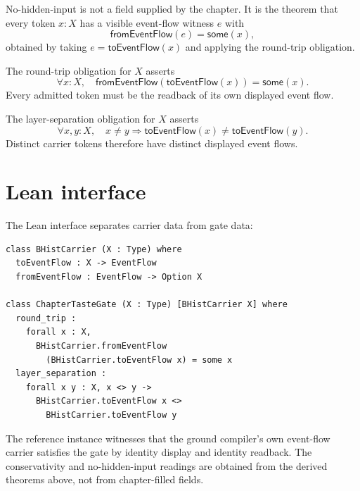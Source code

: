 \begin{definition}
\label{def:taste-gate-no-hidden-input}
No-hidden-input is not a field supplied by the chapter. It is the theorem that
every token $x:X$ has a visible event-flow witness $e$ with
$$
\mathsf{fromEventFlow}(e)=\mathsf{some}(x),
$$
obtained by taking $e=\mathsf{toEventFlow}(x)$ and applying the round-trip
obligation.
\end{definition}

\begin{definition}
\label{def:taste-gate-round-trip}
The round-trip obligation for $X$ asserts
$$
\forall x:X,\quad
\mathsf{fromEventFlow}(\mathsf{toEventFlow}(x))=\mathsf{some}(x).
$$
Every admitted token must be the readback of its own displayed event flow.
\end{definition}

\begin{definition}
\label{def:taste-gate-layer-separation}
The layer-separation obligation for $X$ asserts
$$
\forall x,y:X,\quad
x\neq y\Rightarrow
\mathsf{toEventFlow}(x)\neq \mathsf{toEventFlow}(y).
$$
Distinct carrier tokens therefore have distinct displayed event flows.
\end{definition}

\section{Lean interface}
\label{sec:taste-gate-lean-interface}

The Lean interface separates carrier data from gate data:

\begin{verbatim}
class BHistCarrier (X : Type) where
  toEventFlow : X -> EventFlow
  fromEventFlow : EventFlow -> Option X

class ChapterTasteGate (X : Type) [BHistCarrier X] where
  round_trip :
    forall x : X,
      BHistCarrier.fromEventFlow
        (BHistCarrier.toEventFlow x) = some x
  layer_separation :
    forall x y : X, x <> y ->
      BHistCarrier.toEventFlow x <>
        BHistCarrier.toEventFlow y
\end{verbatim}

The reference instance witnesses that the ground compiler's own event-flow
carrier satisfies the gate by identity display and identity readback. The
conservativity and no-hidden-input readings are obtained from the derived
theorems above, not from chapter-filled fields.

